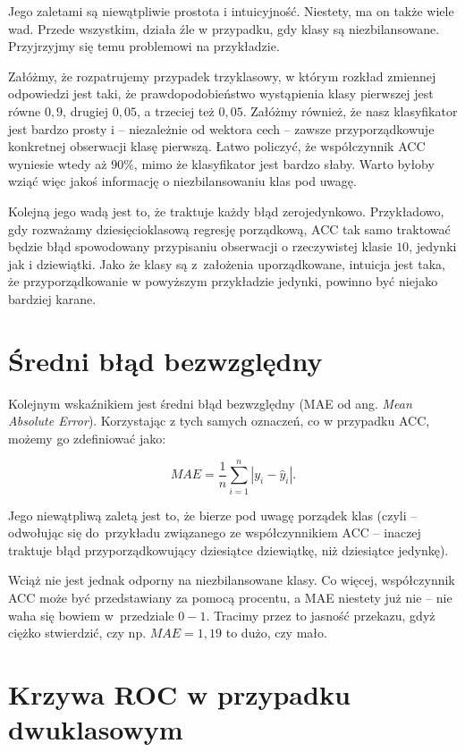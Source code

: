 \documentclass{mini}
\begin{document}
Jego zaletami są niewątpliwie prostota i intuicyjność. Niestety, ma on także wiele wad. Przede wszystkim, działa źle w przypadku, gdy klasy są niezbilansowane. Przyjrzyjmy się temu problemowi na przykładzie. 

Załóżmy, że rozpatrujemy przypadek trzyklasowy, w którym rozkład zmiennej odpowiedzi jest taki, że prawdopodobieństwo wystąpienia klasy pierwszej jest równe $0,9$, drugiej $0,05$, a trzeciej też $0,05$. Załóżmy również, że nasz klasyfikator jest bardzo prosty i -- niezależnie od wektora cech -- zawsze przyporządkowuje konkretnej obserwacji klasę pierwszą. Łatwo policzyć, że współczynnik ACC wyniesie wtedy aż $90\%$, mimo że klasyfikator jest bardzo słaby. Warto byłoby wziąć więc jakoś informację o niezbilansowaniu klas pod uwagę.  

Kolejną jego wadą jest to, że traktuje każdy błąd zerojedynkowo. Przykładowo, gdy rozważamy dziesięcioklasową regresję porządkową, ACC tak samo traktować będzie błąd spowodowany przypisaniu obserwacji o rzeczywistej klasie $10$, jedynki jak i dziewiątki. Jako że klasy są z~założenia uporządkowane, intuicja jest taka, że przyporządkowanie w powyższym przykładzie jedynki, powinno być niejako bardziej karane.

\section{Średni błąd bezwzględny}

Kolejnym wskaźnikiem jest średni błąd bezwzględny (MAE od ang. \textit{Mean Absolute Error}). Korzystając z tych samych oznaczeń, co w przypadku ACC, możemy go zdefiniować jako:

\begin{equation}\label{dop2}
MAE = \frac{1}{n}\sum_{i=1}^n | y_i - \hat{y}_i |. 
\end{equation}

Jego niewątpliwą zaletą jest to, że bierze pod uwagę porządek klas (czyli -- odwołując się do~przykładu związanego ze współczynnikiem ACC -- inaczej traktuje błąd przyporządkowujący dziesiątce dziewiątkę, niż dziesiątce jedynkę). 

Wciąż nie jest jednak odporny na niezbilansowane klasy. Co więcej, współczynnik ACC może być przedstawiany za pomocą procentu, a MAE niestety już nie -- nie waha się bowiem w~przedziale $0-1$. Tracimy przez to jasność przekazu, gdyż ciężko stwierdzić, czy np. \mbox{$MAE=1,19$} to dużo, czy mało. 

\section{Krzywa ROC w przypadku dwuklasowym}
\end{document}
